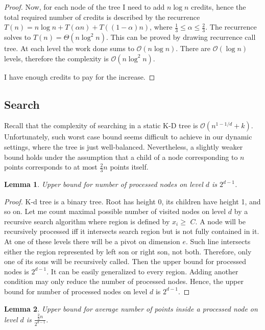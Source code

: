 \documentclass[10pt,a4paper]{article}
\newtheorem{lemma}{Lemma}
\newcommand{\Oh}{\mathcal{O}}
\begin{document}
\begin{proof}
Now, for each node of the tree I need to add $n\log n$ credits, hence the total required number of credits is described by the recurrence $T(n)=n\log n+T(\alpha n)+T((1-\alpha)n)$, where $\frac{1}{3}\leq \alpha \leq \frac{2}{3}$. The recurrence solves to $T(n)=\Theta(n\log^{2}n)$. This can be proved by drawing recurrence call tree. At each level the work done sums to $\Oh(n \log n)$. There are $\Oh(\log n)$ levels, therefore the complexity is $\Oh(n \log^2 n)$.

I have enough credits to pay for the increase.
\end{proof}

\subsection{Search}

Recall that the complexity of searching in a static K-D tree is $\Oh(n^{1-1/d} + k)$. Unfortunately, such worst case bound seems difficult to achieve in our dynamic settings, where the tree is just well-balanced. Nevertheless, a slightly weaker bound holds under the assumption that a child of a node corresponding to $n$ points corresponds to at most $\frac{2}{3}n$ points itself.

\begin{lemma}\label{lem:3}
Upper bound for number of processed nodes on level $d$ is $2^{d-1}$.
\end{lemma}

\begin{proof}

K-d tree is a binary tree. Root has height 0, its children have height 1, and so on. Let me count maximal possible number of visited nodes on level $d$ by a recursive search algorithm where region is defined by $x_i \geq$ $C$. A node will be recursively processed iff it intersects search region but is not fully contained in it. At one of these levels there will be a pivot on dimension $e$. Such line intersects either the region represented by left son or right son, not both. Therefore, only one of its sons will be recursively called. Then the upper bound for processed nodes is $2^{d-1}$. It can be easily generalized to every region. Adding another condition may only reduce the number of processed nodes. Hence, the upper bound for number of processed nodes on level $d$ is $2^{d-1}$. 
\end{proof}


\begin{lemma}\label{lem:4}
Upper bound for average number of points inside a processed node on level $d$ is $\frac{\frac{2}{3}n}{2^{d-1}}$.
\end{lemma}
\end{document}
